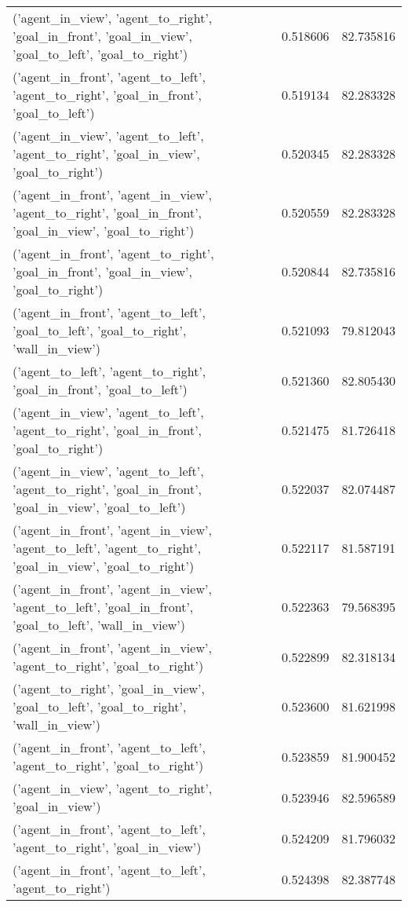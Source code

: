 \begin{tabular}{lrr}
('agent\_in\_view', 'agent\_to\_right', 'goal\_in\_front', 'goal\_in\_view', 'goal\_to\_left', 'goal\_to\_right') & 0.518606 & 82.735816 \\
('agent\_in\_front', 'agent\_to\_left', 'agent\_to\_right', 'goal\_in\_front', 'goal\_to\_left') & 0.519134 & 82.283328 \\
('agent\_in\_view', 'agent\_to\_left', 'agent\_to\_right', 'goal\_in\_view', 'goal\_to\_right') & 0.520345 & 82.283328 \\
('agent\_in\_front', 'agent\_in\_view', 'agent\_to\_right', 'goal\_in\_front', 'goal\_in\_view', 'goal\_to\_right') & 0.520559 & 82.283328 \\
('agent\_in\_front', 'agent\_to\_right', 'goal\_in\_front', 'goal\_in\_view', 'goal\_to\_right') & 0.520844 & 82.735816 \\
('agent\_in\_front', 'agent\_to\_left', 'goal\_to\_left', 'goal\_to\_right', 'wall\_in\_view') & 0.521093 & 79.812043 \\
('agent\_to\_left', 'agent\_to\_right', 'goal\_in\_front', 'goal\_to\_left') & 0.521360 & 82.805430 \\
('agent\_in\_view', 'agent\_to\_left', 'agent\_to\_right', 'goal\_in\_front', 'goal\_to\_right') & 0.521475 & 81.726418 \\
('agent\_in\_view', 'agent\_to\_left', 'agent\_to\_right', 'goal\_in\_front', 'goal\_in\_view', 'goal\_to\_left') & 0.522037 & 82.074487 \\
('agent\_in\_front', 'agent\_in\_view', 'agent\_to\_left', 'agent\_to\_right', 'goal\_in\_view', 'goal\_to\_right') & 0.522117 & 81.587191 \\
('agent\_in\_front', 'agent\_in\_view', 'agent\_to\_left', 'goal\_in\_front', 'goal\_to\_left', 'wall\_in\_view') & 0.522363 & 79.568395 \\
('agent\_in\_front', 'agent\_in\_view', 'agent\_to\_right', 'goal\_to\_right') & 0.522899 & 82.318134 \\
('agent\_to\_right', 'goal\_in\_view', 'goal\_to\_left', 'goal\_to\_right', 'wall\_in\_view') & 0.523600 & 81.621998 \\
('agent\_in\_front', 'agent\_to\_left', 'agent\_to\_right', 'goal\_to\_right') & 0.523859 & 81.900452 \\
('agent\_in\_view', 'agent\_to\_right', 'goal\_in\_view') & 0.523946 & 82.596589 \\
('agent\_in\_front', 'agent\_to\_left', 'agent\_to\_right', 'goal\_in\_view') & 0.524209 & 81.796032 \\
('agent\_in\_front', 'agent\_to\_left', 'agent\_to\_right') & 0.524398 & 82.387748 \\

\end{tabular}
